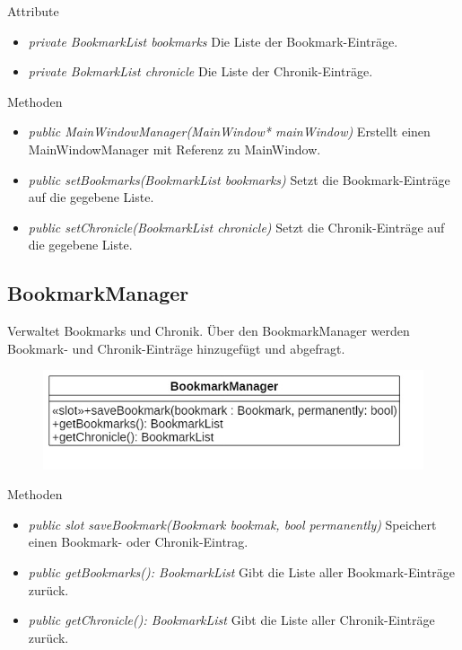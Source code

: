 Attribute
\begin{itemize}
	\item\textit{private BookmarkList bookmarks}
	Die Liste der Bookmark-Einträge.
	\item\textit{private BokmarkList chronicle}
	Die Liste der Chronik-Einträge.

\end{itemize}

Methoden
\begin{itemize}
	\item\textit{public MainWindowManager(MainWindow* mainWindow)}
	Erstellt einen MainWindowManager mit Referenz zu MainWindow.
	\item\textit{public setBookmarks(BookmarkList bookmarks)}
	Setzt die Bookmark-Einträge auf die gegebene Liste.
	\item\textit{public setChronicle(BookmarkList chronicle) }
	Setzt die Chronik-Einträge auf die gegebene Liste.
\end{itemize}

\subsection*{BookmarkManager}
Verwaltet Bookmarks und Chronik. Über den BookmarkManager werden Bookmark- und Chronik-Einträge hinzugefügt und abgefragt.

\begin{figure}[H]
\centering
\includegraphics[scale=0.5]{img/Klassendiagramm/Klassen/Controller/BookmarkManager}
\label{fig:bookmarkManager}
\end{figure}

Methoden
\begin{itemize}
	\item\textit{public slot saveBookmark(Bookmark bookmak, bool permanently)}
	Speichert einen Bookmark- oder Chronik-Eintrag.
	\item\textit{public getBookmarks(): BookmarkList}
	Gibt die Liste aller Bookmark-Einträge zurück.
	\item\textit{public getChronicle(): BookmarkList}
	Gibt die Liste aller Chronik-Einträge zurück.
\end{itemize}

